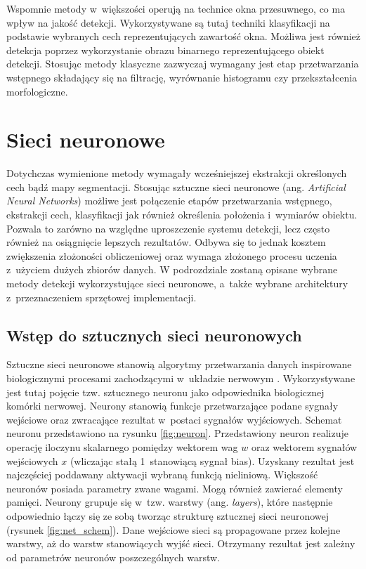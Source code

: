 
Wspomnie metody w~większości operują na technice okna przesuwnego, co ma wpływ na jakość detekcji.
Wykorzystywane są tutaj techniki klasyfikacji na podstawie wybranych cech reprezentujących zawartość okna.
Możliwa jest również detekcja poprzez wykorzystanie obrazu binarnego reprezentującego obiekt detekcji.
Stosując metody klasyczne zazwyczaj wymagany jest etap przetwarzania wstępnego składający się na filtrację, wyrównanie histogramu czy przekształcenia morfologiczne.


\section{Sieci neuronowe}

Dotychczas wymienione metody wymagały wcześniejszej ekstrakcji określonych cech bądź mapy segmentacji.
Stosując sztuczne sieci neuronowe (ang. \emph{Artificial Neural Networks}) możliwe jest połączenie etapów przetwarzania wstępnego, ekstrakcji cech, klasyfikacji jak również określenia położenia i~wymiarów obiektu. 
Pozwala to zarówno na względne uproszczenie systemu detekcji, lecz często również na osiągnięcie lepszych rezultatów. 
Odbywa się to jednak kosztem zwiększenia złożoności obliczeniowej oraz wymaga złożonego procesu uczenia z~użyciem dużych zbiorów danych.
W podrozdziale zostaną opisane wybrane metody detekcji wykorzystujące sieci neuronowe, a~także wybrane architektury z~przeznaczeniem sprzętowej implementacji.

\subsection{Wstęp do sztucznych sieci neuronowych}
Sztuczne sieci neuronowe stanowią algorytmy przetwarzania danych inspirowane biologicznymi procesami zachodzącymi w~układzie nerwowym \cite{SN_tadeusiewicz}. 
Wykorzystywane jest tutaj pojęcie tzw. sztucznego neuronu jako odpowiednika biologicznej komórki nerwowej. 
Neurony stanowią funkcje przetwarzające podane sygnały wejściowe oraz zwracające rezultat w~postaci sygnałów wyjściowych. 
Schemat neuronu przedstawiono na rysunku \ref{fig:neuron}.
Przedstawiony neuron realizuje operację iloczynu skalarnego pomiędzy wektorem wag $w$ oraz wektorem sygnałów wejściowych $x$ (wliczając stałą 1~stanowiącą sygnał bias).
Uzyskany rezultat jest najczęściej poddawany aktywacji wybraną funkcją nieliniową.
Większość neuronów posiada parametry zwane wagami. Mogą również zawierać elementy pamięci.
Neurony grupuje się w~tzw. warstwy (ang. \emph{layers}), które następnie odpowiednio łączy się ze sobą tworząc strukturę sztucznej sieci neuronowej (rysunek \ref{fig:net_schem}).
Dane wejściowe sieci są propagowane przez kolejne warstwy, aż do warstw stanowiących wyjść sieci.
Otrzymany rezultat jest zależny od parametrów neuronów poszczególnych warstw.

